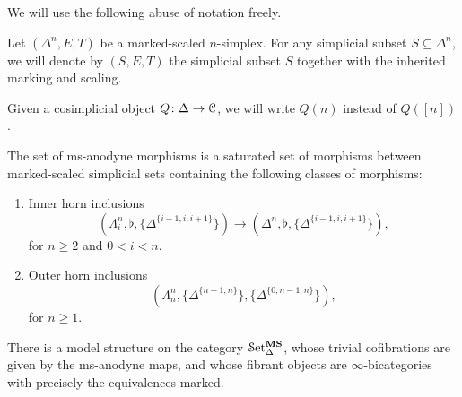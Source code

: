 \documentclass[main.tex]{subfiles}
\begin{document}
We will use the following abuse of notation freely.

\begin{notation}
  Let $(\Delta^{n}, E, T)$ be a marked-scaled $n$-simplex. For any simplicial subset $S \subseteq \Delta^{n}$, we will denote by $(S, E, T)$ the simplicial subset $S$ together with the inherited marking and scaling.
\end{notation}

\begin{notation}
  Given a cosimplicial object $Q\colon \Delta \to \mathcal{C}$, we will write $Q(n)$ instead of $Q([n])$.
\end{notation}

\begin{definition}
  \label{def:ms-anodyne_morphisms}
  The set of ms-anodyne morphisms is a saturated set of morphisms between marked-scaled simplicial sets containing the following classes of morphisms:
  \begin{enumerate}[label=(A\arabic*)]
    \item\label{item:innerms} Inner horn inclusions
      \begin{equation*}
        (\Lambda^{n}_{i}, \flat, \{\Delta^{\{i-1,i,i+1\}}\}) \to (\Delta^{n}, \flat, \{\Delta^{\{i-1,i,i+1\}}\}),
      \end{equation*}
      for $n \geq 2$ and $0 < i < n$.

    \item\label{item:outerms} Outer horn inclusions
      \begin{equation*}
        (\Lambda^{n}_{n}, \{\Delta^{\{n-1,n\}}\}, \{\Delta^{\{0, n-1, n\}}\}),
      \end{equation*}
      for $n \geq 1$.
  \end{enumerate}
\end{definition}

\begin{theorem}
  There is a model structure on the category $\mathcal{S}\mathrm{et}_{\Delta}^{\mathbf{MS}}$, whose trivial cofibrations are given by the ms-anodyne maps, and whose fibrant objects are $\infty$-bicategories with precisely the equivalences marked.
\end{theorem}
\end{document}
